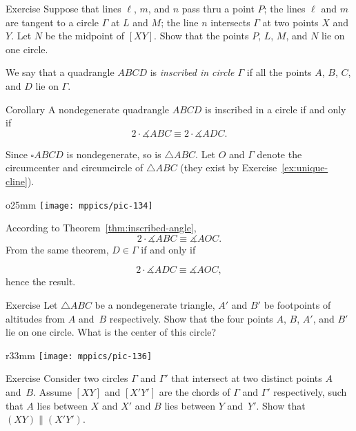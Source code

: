 \begin{thm}{Exercise}\label{ex:tnagents+midpoint}
Suppose that lines $\ell$, $m$, and $n$ pass thru a point $P$;
the lines $\ell$ and $m$ are tangent to a circle $\Gamma$ at $L$ and $M$;
the line $n$ intersects $\Gamma$ at two points $X$ and $Y$.
Let $N$ be the midpoint of $[XY]$.
Show that the points $P$, $L$, $M$, and $N$ lie on one circle.
\end{thm}

We say that a quadrangle $ABCD$ is 
\emph{inscribed in circle $\Gamma$}
if all the points $A$, $B$, $C$, and $D$ lie on $\Gamma$.

\begin{thm}{Corollary}\label{cor:inscribed-quadrangle}
A nondegenerate quadrangle $ABCD$ is inscribed in a circle if and only if 
\[2\cdot\measuredangle ABC\equiv 2\cdot\measuredangle ADC.\]

\end{thm}

Since $\square ABCD$ is nondegenerate, so is $\triangle ABC$.
Let $O$ and $\Gamma$ denote the circumcenter and circumcircle of $\triangle ABC$ (they exist by Exercise~\ref{ex:unique-cline}).

{

\begin{wrapfigure}[10]{o}{25mm}
\vskip-1mm
\centering
\texttt{[image: mppics/pic-134]}
\end{wrapfigure}

According to Theorem~\ref{thm:inscribed-angle},
$$
2\cdot\measuredangle ABC
\equiv
\measuredangle AOC.
$$
From the same theorem, $D\in\Gamma$ if and only if 

$$
2\cdot\measuredangle ADC
\equiv\measuredangle AOC,
$$
hence the result.
\qeds

}


{

\begin{thm}{Exercise}\label{ex:VVAA}
Let $\triangle A B C$ be a nondegenerate triangle,
$A'$ and $B'$ be footpoints of altitudes from $A$ and~$B$ respectively.
Show that the four points $A$, $B$, $A'$, and $B'$ lie on one circle.
What is the center of this circle?
\end{thm}

\begin{wrapfigure}{r}{33mm}
\vskip-7mm
\centering
\texttt{[image: mppics/pic-136]}
\end{wrapfigure}

\begin{thm}{Exercise}\label{ex:secant-circles}
Consider two circles $\Gamma$ and $\Gamma'$ that intersect at two distinct points $A$ and~$B$.
Assume $[XY]$ and $[X'Y']$ are the chords of $\Gamma$ and $\Gamma'$ respectively,
such that $A$ lies between $X$ and $X'$ and $B$ lies between $Y$ and~$Y'$.
Show that $(XY)\parallel (X'Y')$.
\end{thm}

}

